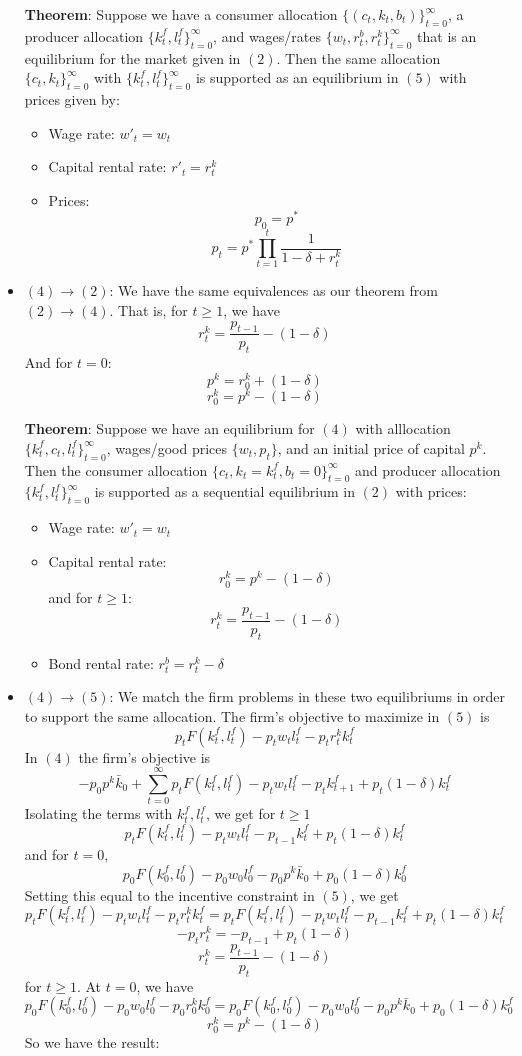 \documentclass[10pt,letter]{article}
\begin{document}
\begin{itemize}
\textbf{Theorem}: Suppose we have a consumer allocation $\{ (c_t, k_t, b_t) \}_{t=0}^\infty$, a producer allocation $\{ k_t^f, l_t^f \}_{t=0}^\infty$, and wages/rates $\{ w_t, r_t^b, r_t^k \}_{t=0}^\infty$ that is an equilibrium for the market given in $(2)$. Then the same allocation $\{ c_t, k_t \}_{t=0}^\infty$  with $\{ k_t^f, l_t^f \}_{t=0}^\infty$ is supported as an equilibrium in $(5)$ with prices given by:
\begin{itemize}
\item Wage rate: $w'_t = w_t$
\item Capital rental rate: $r'_t = r^k_t$
\item Prices:
\[ p_0 = p^* \]
\[ p_t = p^* \prod_{t=1}^{t} \frac{1}{1-\delta + r_{t}^k}\]
\end{itemize}
\item $(4) \to (2)$: We have the same equivalences as our theorem from $(2) \to (4)$. That is, for $t \ge 1$, we have
\[ r_t^k = \frac{p_{t-1}}{p_t} - (1-\delta) \]
And for $t = 0$:
\[ p^k = r_0^k + (1-\delta) \]
\[ r_0^k = p^k - (1-\delta)\]

\textbf{Theorem}: Suppose we have an equilibrium for $(4)$ with alllocation $\{ k_t^f, c_t, l_t^f \}_{t=0}^\infty$, wages/good prices $\{ w_t, p_t \}$, and an initial price of capital $p^k$. Then the consumer allocation $\{ c_t, k_t = k_t^f, b_t = 0 \}_{t=0}^\infty$ and producer allocation $\{ k_t^f, l_t^f \}_{t=0}^\infty$ is supported as a sequential equilibrium in $(2)$ with prices:
\begin{itemize}
\item Wage rate: $w'_t = w_t$
\item Capital rental rate:
\[ r_0^k = p^k - (1-\delta)\]
and for $t \ge 1$:
\[ r_t^k = \frac{p_{t-1}}{p_t} - (1-\delta) \]
\item Bond rental rate: $r^b_t = r^k_t - \delta$
\end{itemize}
\item $(4) \to (5)$: We match the firm problems in these two equilibriums in order to support the same allocation. The firm's objective to maximize in $(5)$ is
\[ p_t F(k_t^f, l_t^f) - p_t w_t l_t^f - p_t r^k_t k_t^f \]
In $(4)$ the firm's objective is
\[ -p_0 p^k \bar{k}_0 + \sum_{t=0}^\infty p_t F(k_t^f, l_t^f) - p_tw_tl_t^f - p_tk^f_{t+1} + p_t(1-\delta)k^f_t  \]
Isolating the terms with $k_t^f, l_t^f$, we get for $t \ge 1$
\[ p_t F(k_t^f, l_t^f) - p_tw_tl_t^f - p_{t-1}k^f_{t} + p_t(1-\delta)k^f_t \]
and for $t=0$,
\[ p_0 F(k_0^f, l_0^f) - p_0w_0l_0^f - p_0 p^k \bar{k}_0 + p_0(1-\delta)k^f_0 \]
Setting this equal to the incentive constraint in $(5)$, we get
\[ p_t F(k_t^f, l_t^f) - p_t w_t l_t^f - p_t r^k_t k_t^f = p_t F(k_t^f, l_t^f) - p_tw_tl_t^f - p_{t-1}k^f_{t} + p_t(1-\delta)k^f_t \]
\[ - p_t r^k_t = - p_{t-1}+ p_t(1-\delta) \]
\[ r^k_t = \frac{p_{t-1}}{p_t} - (1-\delta) \]
for $t \ge 1$. At $t=0$, we have
\[ p_0 F(k_0^f, l_0^f) - p_0 w_0 l_0^f - p_0 r^k_0 k_0^f = p_0 F(k_0^f, l_0^f) - p_0w_0l_0^f - p_0 p^k \bar{k}_0 + p_0(1-\delta)k^f_0 \]
\[ r^k_0  = p^k  - (1-\delta) \]
So we have the result:


\end{itemize}
\end{document}
